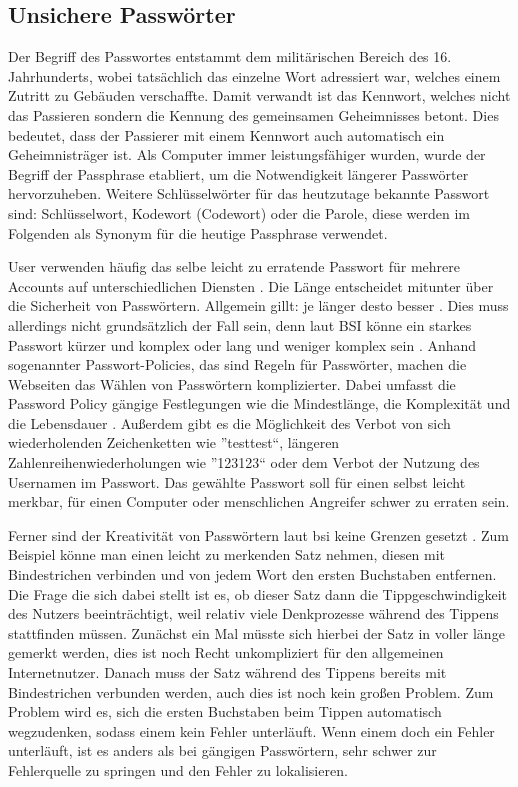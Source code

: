 \subsection{Unsichere Passwörter}
Der Begriff des Passwortes entstammt dem militärischen Bereich des 16. Jahrhunderts, wobei tatsächlich das einzelne Wort adressiert war, welches einem Zutritt zu Gebäuden verschaffte. Damit verwandt ist das Kennwort, welches nicht das Passieren sondern die Kennung des gemeinsamen Geheimnisses betont. Dies bedeutet, dass der Passierer mit einem Kennwort auch automatisch ein Geheimnisträger ist. Als Computer immer leistungsfähiger wurden, wurde der Begriff der Passphrase etabliert, um die Notwendigkeit längerer Passwörter hervorzuheben. Weitere Schlüsselwörter für das heutzutage bekannte Passwort sind: Schlüsselwort, Kodewort (Codewort) oder die Parole, diese werden im Folgenden als Synonym für die heutige Passphrase verwendet.

User verwenden häufig das selbe leicht zu erratende Passwort für mehrere Accounts auf unterschiedlichen Diensten \cite{A3}. Die Länge entscheidet mitunter über die Sicherheit von Passwörtern. Allgemein gillt: je länger desto besser \cite{A4}. Dies muss allerdings nicht grundsätzlich der Fall sein, denn laut BSI könne ein starkes Passwort kürzer und komplex oder lang und weniger komplex sein \cite{A4}. Anhand sogenannter Passwort-Policies, das sind Regeln für Passwörter, machen die Webseiten das Wählen von Passwörtern komplizierter. Dabei umfasst die Password Policy gängige Festlegungen wie die Mindestlänge, die Komplexität und die Lebensdauer \cite{A3}. Außerdem gibt es die Möglichkeit des Verbot von sich wiederholenden Zeichenketten wie ''testtest``, längeren Zahlenreihenwiederholungen wie ''123123`` oder dem Verbot der Nutzung des Usernamen im Passwort. Das gewählte Passwort soll für einen selbst leicht merkbar, für einen Computer oder menschlichen Angreifer schwer zu erraten sein.

Ferner sind der Kreativität von Passwörtern laut \ac{bsi} keine Grenzen gesetzt \cite{A4}. Zum Beispiel könne man einen leicht zu merkenden Satz nehmen, diesen mit Bindestrichen verbinden und von jedem Wort den ersten Buchstaben entfernen. Die Frage die sich dabei stellt ist es, ob dieser Satz dann die Tippgeschwindigkeit des Nutzers beeinträchtigt, weil relativ viele Denkprozesse während des Tippens stattfinden müssen. Zunächst ein Mal müsste sich hierbei der Satz in voller länge gemerkt werden, dies ist noch Recht unkompliziert für den allgemeinen Internetnutzer. Danach muss der Satz während des Tippens bereits mit Bindestrichen verbunden werden, auch dies ist noch kein großen Problem. Zum Problem wird es, sich die ersten Buchstaben beim Tippen automatisch wegzudenken, sodass einem kein Fehler unterläuft. Wenn einem doch ein Fehler unterläuft, ist es anders als bei gängigen Passwörtern, sehr schwer zur Fehlerquelle zu springen und den Fehler zu lokalisieren.
\newpage

